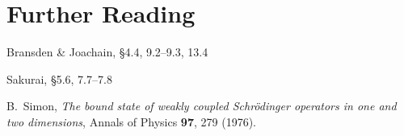 \documentclass[pra,12pt]{revtex4}
\begin{document}
\section*{Further Reading}

\begin{enumerate}[[1{]}]
\item Bransden \& Joachain, \S4.4, 9.2--9.3, 13.4
\item Sakurai, \S5.6, 7.7--7.8

\item B.~Simon, \textit{The bound state of weakly coupled
  Schr\"odinger operators in one and two dimensions}, Annals of
  Physics \textbf{97}, 279 (1976).
\label{cite:simon}
\end{enumerate}
\end{document}
